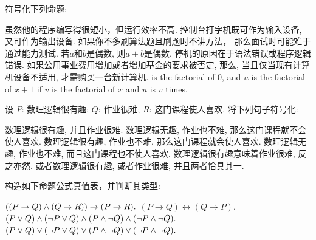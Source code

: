 \begin{Exercise}\label{ex:proplogic}

\Question 符号化下列命题: 
\begin{tasks}
	\task 虽然他的程序编写得很短小，但运行效率不高. 
	\task 控制台打字机既可作为输入设备, 又可作为输出设备.
	\task 如果你不多刷算法题且刷题时不讲方法， 那么面试时可能难于通过能力测试.
	\task 若$a$和$b$是偶数, 则$a+b$是偶数.
	\task 停机的原因在于语法错误或程序逻辑错误.
	\task 如果公用事业费用增加或者增加基金的要求被否定, 那么, 当且仅当现有计算机设备不适用, 才需购买一台新计算机.
	 is the factorial of 0, and $u$ is the factorial of $x+1$ if $v$ is the factorial of $x$ and $u$ is $v$ times. 
\end{tasks}

\Question 设 $P$: 数理逻辑很有趣; $Q$: 作业很难; $R$: 这门课程使人喜欢. 将下列句子符号化:
\begin{tasks}
\task 数理逻辑很有趣, 并且作业很难.
\task 数理逻辑无趣, 作业也不难, 那么这门课程就不会使人喜欢.
\task 数理逻辑很有趣, 作业也不难, 那么这门课程就会使人喜欢. 
\task 数理逻辑无趣, 作业也不难, 而且这门课程也不使人喜欢.
\task 数理逻辑很有趣意味着作业很难, 反之亦然.
\task 或者数理逻辑很有趣, 或者作业很难, 并且两者恰具其一.	
\end{tasks}

\Question 构造如下命题公式真值表，并判断其类型:
\begin{tasks}
	\task  $((P\to Q)\land(Q\to R))\to(P\to R).$
	\task $(P\to Q)\leftrightarrow(Q\to P).$
	\task $(P\lor Q)\land (\lnot P\lor Q)\land (P\land \lnot Q)\land (\lnot P\land \lnot Q).$
	\task $(P\lor Q)\lor (\lnot P\lor Q)\lor (P\land \lnot Q)\lor (\lnot P\land \lnot Q).$
\end{tasks}
\end{Exercise}
